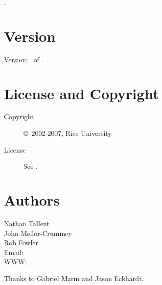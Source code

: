 \documentclass[english]{article}
\begin{document}
.

\section{Version}

Version: \Version\ of \Date.

\section{License and Copyright}

\begin{description}
\item[Copyright] \copyright\ 2002-2007, Rice University.
\item[License] See .
\end{description}

\section{Authors}

\noindent
Nathan Tallent \\
John Mellor-Crummey \\
Rob Fowler \\
Email:  \\
WWW: .

Thanks to Gabriel Marin and Jason Eckhardt.

\LatexManEnd
\end{document}
